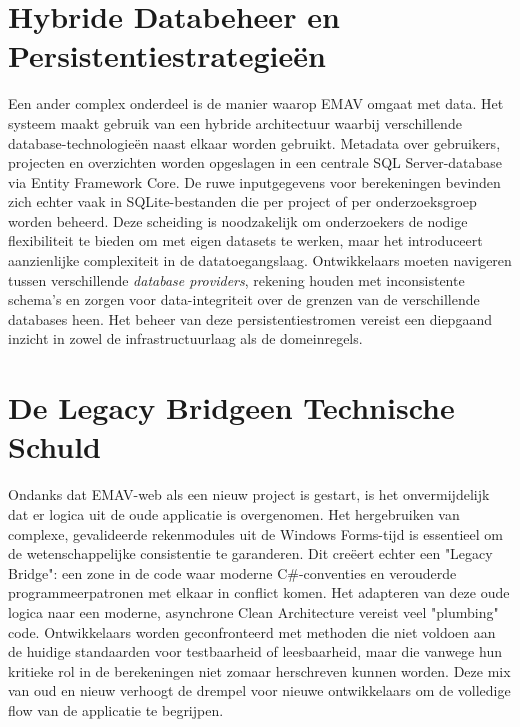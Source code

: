 \section{Hybride Databeheer en Persistentiestrategieën}
Een ander complex onderdeel is de manier waarop EMAV omgaat met data. Het systeem maakt gebruik van een hybride architectuur waarbij verschillende database-technologieën naast elkaar worden gebruikt. Metadata over gebruikers, projecten en overzichten worden opgeslagen in een centrale SQL Server-database via Entity Framework Core. De ruwe inputgegevens voor berekeningen bevinden zich echter vaak in SQLite-bestanden die per project of per onderzoeksgroep worden beheerd.
Deze scheiding is noodzakelijk om onderzoekers de nodige flexibiliteit te bieden om met eigen datasets te werken, maar het introduceert aanzienlijke complexiteit in de datatoegangslaag. Ontwikkelaars moeten navigeren tussen verschillende \textit{database providers}, rekening houden met inconsistente schema's en zorgen voor data-integriteit over de grenzen van de verschillende databases heen. Het beheer van deze persistentiestromen vereist een diepgaand inzicht in zowel de infrastructuurlaag als de domeinregels.
\section{De \textquotedbl Legacy Bridge\textquotedbl \@ en Technische Schuld}
Ondanks dat EMAV-web als een nieuw project is gestart, is het onvermijdelijk dat er logica uit de oude applicatie is overgenomen. Het hergebruiken van complexe, gevalideerde rekenmodules uit de Windows Forms-tijd is essentieel om de wetenschappelijke consistentie te garanderen. Dit creëert echter een "Legacy Bridge": een zone in de code waar moderne C\#-conventies en verouderde programmeerpatronen met elkaar in conflict komen.
Het adapteren van deze oude logica naar een moderne, asynchrone Clean Architecture vereist veel "plumbing" code. Ontwikkelaars worden geconfronteerd met methoden die niet voldoen aan de huidige standaarden voor testbaarheid of leesbaarheid, maar die vanwege hun kritieke rol in de berekeningen niet zomaar herschreven kunnen worden. Deze mix van oud en nieuw verhoogt de drempel voor nieuwe ontwikkelaars om de volledige flow van de applicatie te begrijpen.
